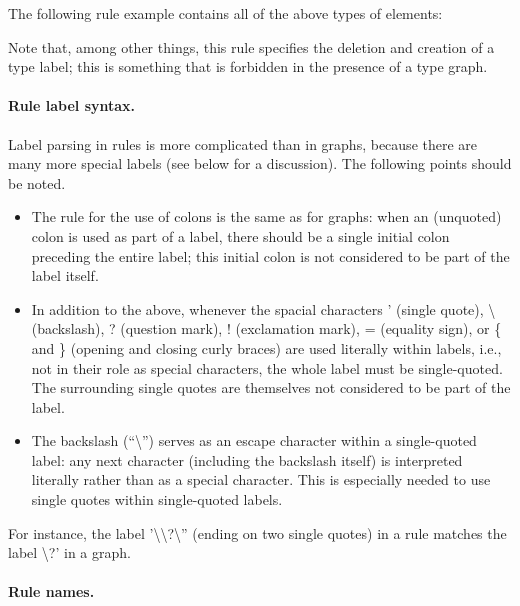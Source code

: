\medskip\noindent The following rule example contains all of the above types of elements:


Note that, among other things, this rule specifies the deletion and creation of
a type label; this is something that is forbidden in the presence of a type
graph.

\paragraph{Rule label syntax.}

Label parsing in rules is more complicated than in graphs, because there are
many more special labels (see below for a discussion). The following points
should be noted.
%
\begin{itemize}\noitemsep
\item The rule for the use of colons is the same as for graphs: when an
  (unquoted) colon is used as part of a label, there should be a single initial
  colon preceding the entire label; this initial colon is not considered to be
  part of the label itself.

\item In addition to the above, whenever the spacial characters \textsf{'}
  (single quote), \textsf{\textbackslash} (backslash), \textsf{?} (question
  mark), \textsf{!}  (exclamation mark), \textsf{=} (equality sign), or
  \textsf{\{} and \textsf{\}} (opening and closing curly braces) are used
  literally within labels, i.e., not in their role as special characters, the
  whole label must be single-quoted. The surrounding single quotes are
  themselves not considered to be part of the label.

\item The backslash (``\textsf{\textbackslash}'') serves as an escape character
  within a single-quoted label: any next character (including the backslash
  itself) is interpreted literally rather than as a special character. This is
  especially needed to use single quotes within single-quoted labels.
\end{itemize}
%
For instance, the label \textsf{'\textbackslash\textbackslash?\textbackslash''}
(ending on two single quotes) in a rule matches the label
\textsf{\textbackslash?'} in a graph.

\paragraph{Rule names.}

